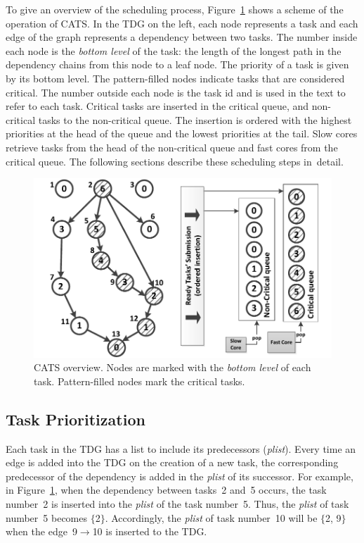 To give an overview of the scheduling process, Figure~\ref{botlevels} shows a scheme of the operation of CATS. In the TDG on the left, each node represents a task and each edge of the graph represents a dependency between two tasks. The number inside each node is the \textit{bottom level} of the task: the length of the longest path in the dependency chains from this node to a leaf node. The priority of a task is given by its bottom level. The pattern-filled nodes indicate tasks that are considered critical. The number outside each node is the task id and is used in the text to refer to each task. Critical tasks are inserted in the critical queue, and non-critical tasks to the non-critical queue. The insertion is ordered with the highest priorities at the head of the queue and the lowest priorities at the tail. Slow cores retrieve tasks from the head of the non-critical queue and fast cores from the critical queue. The following sections describe these scheduling steps in~detail.


\begin{figure}[t]
\includegraphics[width=\columnwidth]{images/fig_1.pdf} 
\centering
\caption{CATS overview. Nodes are marked with the \textit{bottom level} of each task. Pattern-filled nodes mark the critical tasks.}
\label{botlevels}
\vspace{-0.5cm}
\end{figure}


\subsection{Task Prioritization}

Each task in the TDG has a list to include its predecessors (\textit{plist}). Every time an edge is added into the TDG on the creation of a new task, the corresponding predecessor of the dependency is added in the \textit{plist} of its successor. For example, in Figure~\ref{botlevels}, when the dependency between tasks~2 and~5 occurs, the task number~2 is inserted into the \textit{plist} of the task number~5. Thus, the \textit{plist} of task number~5 becomes $\{$2$\}$. Accordingly, the \textit{plist} of task number~10 will be $\{$2, 9$\}$ when the edge~9$\rightarrow$10 is inserted to the TDG. 

